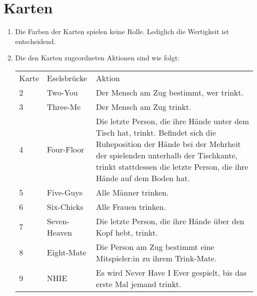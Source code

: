 \section{Karten}\label{Ring_of_Fire:Karten}
\begin{enumerate}[label={(\arabic*)}]
	\item
	Die Farben der Karten spielen keine Rolle. Lediglich die Wertigkeit ist entscheidend.
	
	\item\label{Ring_of_Fire:Karten:Tabelle}
	Die den Karten zugeordneten Aktionen sind wie folgt:


	\begin{tabulary}{\textwidth}{llL} %
		\toprule
		Karte & Eselsbrücke & Aktion \\
		2  & Two-You        & Der Mensch am Zug bestimmt, wer trinkt.                                                                                                              \\[1ex]
		3  & Three-Me       & Der Mensch am Zug trinkt.                                                                                                                            \\[1ex]
		4  & Four-Floor     & Die letzte Person, die ihre Hände unter dem Tisch hat, trinkt.
		Befindet sich die Ruheposition der Hände bei der Mehrheit der spielenden unterhalb der Tischkante, trinkt stattdessen die letzte Person, die ihre Hände auf dem Boden hat. \\[1ex]
		5  & Five-Guys      & Alle Männer trinken.                                                                                                                                 \\[1ex]
		6  & Six-Chicks     & Alle Frauen trinken.                                                                                                                                 \\[1ex]
		7  & Seven-Heaven   & Die letzte Person, die ihre Hände über den Kopf hebt, trinkt.                                                                                        \\[1ex]
		8  & Eight-Mate     & Die Person am Zug bestimmt eine Mitspieler:in zu ihrem Trink-Mate.                                                                                   \\[1ex]
		9  & NHIE           & Es wird \glqq{} Never Have I Ever\grqq{} gespielt, bis das erste Mal jemand trinkt.                                                                    \\[1ex]

\end{tabulary}
\end{enumerate}
